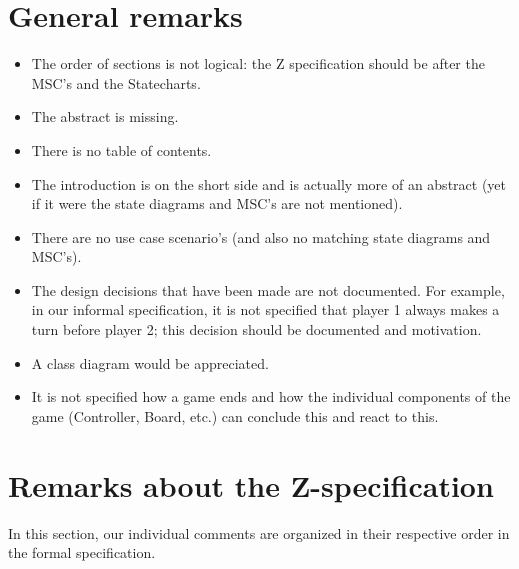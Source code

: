\documentclass[a4paper,11pt]{article}
\begin{document}
	\section{General remarks}
    \begin{itemize}
        \item The order of sections is not logical: the Z specification should be after the MSC's and the Statecharts.
        \item The abstract is missing.
        \item There is no table of contents.
        \item The introduction is on the short side and is actually more of an abstract (yet if it were the state diagrams and MSC's are not mentioned).
        \item There are no use case scenario's (and also no matching state diagrams and MSC's).
        \item The design decisions that have been made are not documented. For example, in our informal specification, it is not specified that player 1 always makes a turn before player 2; this decision should be documented and motivation.
        \item A class diagram would be appreciated.
        \item It is not specified how a game ends and how the individual components of the game (Controller, Board, etc.) can conclude this and react to this.
    \end{itemize}
	
	\section{Remarks about the Z-specification}
    In this section, our individual comments are organized in their respective order in the formal specification.
\end{document}
